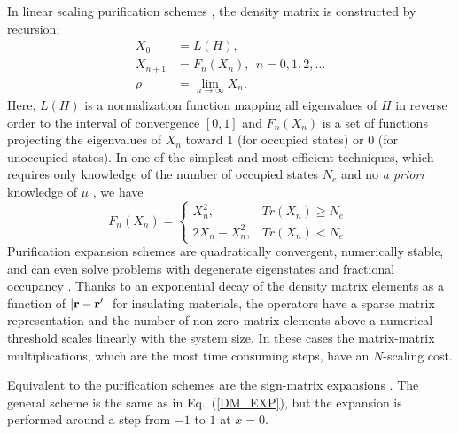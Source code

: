 In linear scaling purification schemes 
\cite{McWeeny60,Clinton69,Palser98,Holas01,NiklassonWLT,NiklassonSP2,NiklassonSP4}, 
the density matrix is constructed by recursion;
\begin{equation}\label{DM_EXP} \begin{array}{ll}
X_0     & = L(H), \\
X_{n+1} & = F_n(X_n), ~~ n = 0,1,2, \ldots\\
\rho    & = \lim_{n \rightarrow \infty} X_n. \end{array}
\end{equation}
Here, $L(H)$ is a normalization function mapping all eigenvalues of $H$
in reverse order to the interval of convergence $[0,1]$ and $F_{n}(X_n)$ 
is a set of functions projecting the eigenvalues of $X_n$
toward  1 (for occupied states) or 0 (for unoccupied states). In one of 
the simplest and most efficient techniques, which requires only 
knowledge of the number of occupied states $N_e$ and no {\em a priori} 
knowledge of $\mu$ \cite{NiklassonSP2}, we have 
\begin{equation} \label{SP2}
F_{n}(X_n) = 
\left\{\begin{array}{ll}
X_n^2, &  Tr(X_n) \geq N_e \\
2X_n - X_n^2, & Tr(X_n) < N_e.
\end{array} \right.
\end{equation}
Purification expansion schemes are quadratically convergent,
numerically stable, and can even solve problems with degenerate
eigenstates and fractional occupancy \cite{NiklassonSP4}. Thanks to an 
exponential decay of the density matrix elements as a function of $|{\bf r-r'}|$ for 
insulating materials, the operators have a sparse matrix 
representation and the number of non-zero matrix elements above a numerical threshold
scales linearly with the system size.  In these cases the matrix-matrix multiplications, 
which are the most time consuming steps, have an $N$-scaling cost.

Equivalent to the purification
schemes are the sign-matrix expansions \cite{Kenney91,Beylkin99,Karoly}.
The general scheme is the same as in Eq.\ (\ref{DM_EXP}), but
the expansion is performed around a step from $-1$ to $1$ at $x=0$.

